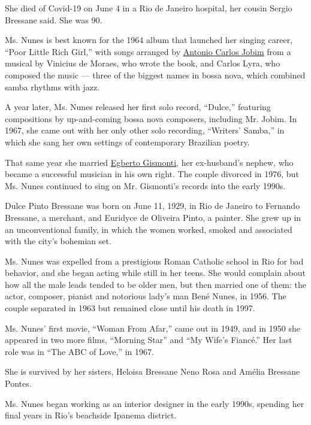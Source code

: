 She died of Covid-19 on June 4 in a Rio de Janeiro hospital, her cousin
Sergio Bressane said. She was 90.

Ms. Nunes is best known for the 1964 album that launched her singing
career, ``Poor Little Rich Girl,'' with songs arranged by
\href{https://www.nytimes3xbfgragh.onion/1994/12/09/obituaries/antonio-carlos-jobim-composer-dies-at-67.html}{Antonio
Carlos Jobim} from a musical by Vinicius de Moraes, who wrote the book,
and Carlos Lyra, who composed the music --- three of the biggest names
in bossa nova, which combined samba rhythms with jazz.

A year later, Ms. Nunes released her first solo record, ``Dulce,''
featuring compositions by up-and-coming bossa nova composers, including
Mr. Jobim. In 1967, she came out with her only other solo recording,
``Writers' Samba,'' in which she sang her own settings of contemporary
Brazilian poetry.

That same year she married
\href{https://www.ecmrecords.com/artists/1435045864/egberto-gismonti}{Egberto
Gismonti}, her ex-husband's nephew, who became a successful musician in
his own right. The couple divorced in 1976, but Ms. Nunes continued to
sing on Mr. Gismonti's records into the early 1990s.

Dulce Pinto Bressane was born on June 11, 1929, in Rio de Janeiro to
Fernando Bressane, a merchant, and Euridyce de Oliveira Pinto, a
painter. She grew up in an unconventional family, in which the women
worked, smoked and associated with the city's bohemian set.

Ms. Nunes was expelled from a prestigious Roman Catholic school in Rio
for bad behavior, and she began acting while still in her teens. She
would complain about how all the male leads tended to be older men, but
then married one of them: the actor, composer, pianist and notorious
lady's man Bené Nunes, in 1956. The couple separated in 1963 but
remained close until his death in 1997.

Ms. Nunes' first movie, ``Woman From Afar,'' came out in 1949, and in
1950 she appeared in two more films, ``Morning Star'' and ``My Wife's
Fiancé.'' Her last role was in ``The ABC of Love,'' in 1967.

She is survived by her sisters, Heloisa Bressane Neno Rosa and Amélia
Bressane Pontes.

Ms. Nunes began working as an interior designer in the early 1990s,
spending her final years in Rio's beachside Ipanema district.

\href{https://www.nytimes3xbfgragh.onion/interactive/2020/obituaries/people-died-coronavirus-obituaries.html?action=click\&pgtype=Article\&state=default\&region=BELOW_MAIN_CONTENT\&context=covid_obits_promo}{}

